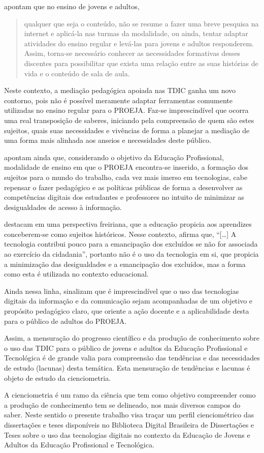 \textcite[p. 387]{Medeiros2021} apontam que no ensino de jovens e adultos,

\begin{quote}
qualquer que seja o conteúdo, não se resume a fazer uma breve pesquisa
na internet e aplicá-la nas turmas da modalidade, ou ainda, tentar
adaptar atividades do ensino regular e levá-las para jovens e adultos
responderem. Assim, torna-se necessário conhecer as necessidades
formativas desses discentes para possibilitar que exista uma relação
entre as suas histórias de vida e o conteúdo de sala de aula.
\end{quote}


Neste contexto, a mediação pedagógica apoiada nas TDIC ganha um novo
contorno, pois não é possível meramente adaptar ferramentas comumente
utilizadas no ensino regular para o PROEJA. Faz-se imprescindível que
ocorra uma real transposição de saberes, iniciando pela compreensão de
quem são estes sujeitos, quais suas necessidades e vivências de forma a
planejar a mediação de uma forma mais alinhada aos anseios e
necessidades deste público.

\textcite{Barin.et.al.} apontam ainda que, considerando o objetivo da
Educação Profissional, modalidade de ensino em que o PROEJA encontra-se
inserido, a formação dos sujeitos para o mundo do trabalho, cada vez
mais imerso em tecnologias, cabe repensar o fazer pedagógico e as
políticas públicas de forma a desenvolver as competências digitais dos
estudantes e professores no intuito de minimizar as desigualdades de
acesso à informação.

\textcite{morais2023} destacam em uma perspectiva freiriana, que a
educação propicia aos aprendizes conceberem-se como sujeitos históricos.
Nesse contexto, \textcite[p.~10]{Gadotti2000} afirma que, ``{[}\ldots{]} A
tecnologia contribui pouco para a emancipação dos excluídos se não for
associada ao exercício da cidadania'', portanto não é o uso da
tecnologia em si, que propicia a minimização das desigualdades e a
emancipação dos excluídos, mas a forma como esta é utilizada no contexto
educacional.

Ainda nessa linha, \textcite{Alvarenga_Lemos_Neto_2020} sinalizam que é
imprescindível que o uso das tecnologias digitais da informação e da
comunicação sejam acompanhadas de um objetivo e propósito pedagógico
claro, que oriente a ação docente e a aplicabilidade desta para o
público de adultos do PROEJA.

Assim, a mensuração do progresso científico e da produção de
conhecimento sobre o uso das TDIC para o público de jovens e adultos da
Educação Profissional e Tecnológica é de grande valia para compreensão
das tendências e das necessidades de estudo (lacunas) desta temática.
Esta mensuração de tendências e lacunas é objeto de estudo da
cienciometria.

A cienciometria é um ramo da ciência que tem como objetivo compreender
como a produção de conhecimento tem se delineado, nos mais diversos
campos do saber. Neste sentido o presente trabalho visa traçar um perfil
cienciométrico das dissertações e teses disponíveis no Biblioteca
Digital Brasileira de Dissertações e Teses sobre o uso das tecnologias
digitais no contexto da Educação de Jovens e Adultos da Educação
Profissional e Tecnológica.